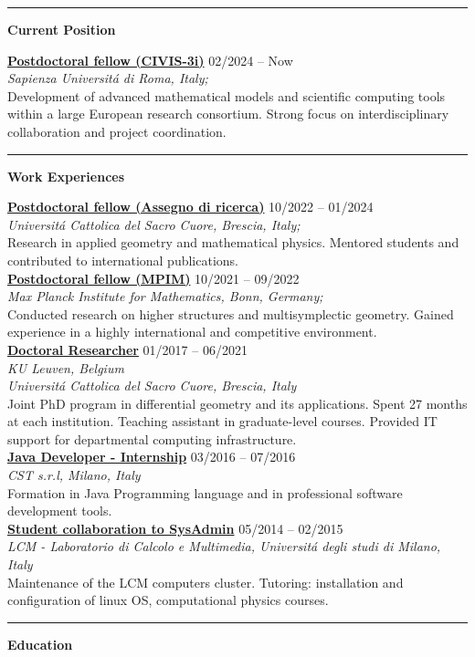 \documentclass[a4paper]{article}
\newcommand{\block}[1]{\hrule \vspace{0.2cm} \textbf{\Large #1} \vspace{0.2cm}}
\newcommand{\voice}[5]{\href{#4}{\textbf{#1}} \hfill #2 \\ \textit{#3} \\ {\small #5} \vspace{0.2cm} \\}
\begin{document}
\begin{minipage}[t]{0.6\columnwidth}

	\block{Current Position}

    	\voice{Postdoctoral fellow (CIVIS-3i)}
			{02/2024 -- Now}
			{Sapienza Universit\'a di Roma, Italy;}
			{https://civis3i.univ-amu.fr/en/civis3i-alliance-programme}       
			{Development of advanced mathematical models and scientific computing tools within a large European research consortium. Strong focus on interdisciplinary collaboration and project coordination.}

    \block{Work Experiences}

	\voice{Postdoctoral fellow (Assegno di ricerca)}
		{10/2022 -- 01/2024}
		{Universit\'a Cattolica del Sacro Cuore, Brescia, Italy;}
		{https://dipartimenti.unicatt.it/dmf-home}       
		{Research in applied geometry and mathematical physics. Mentored students and contributed to international publications.}
	\voice{Postdoctoral fellow (MPIM)}
		{10/2021 -- 09/2022}
		{Max Planck Institute for Mathematics, Bonn, Germany;}
		{https://www.mpim-bonn.mpg.de/}       
		 {Conducted research on higher structures and multisymplectic geometry. Gained experience in a highly international and competitive environment.}
        \voice{Doctoral Researcher}
    	{01/2017 -- 06/2021}
    	{KU Leuven, Belgium \\ Universit\'a Cattolica del Sacro Cuore, Brescia, Italy }
    	{https://scuoledidottorato.unicatt.it/phdschools/science-10574.html}
    	{Joint PhD program in differential geometry and its applications. Spent 27 months at each institution.
        Teaching assistant in graduate-level courses. Provided IT support for departmental computing infrastructure.}	
    \voice{Java Developer - Internship}
        {03/2016  -- 07/2016}
        {CST s.r.l, Milano, Italy}
        {https://www.csttech.it/}       
        {Formation in Java Programming language and in professional software development tools.}
    \voice{Student collaboration to SysAdmin}
        {05/2014 -- 02/2015}
        {LCM - Laboratorio di Calcolo e Multimedia, Universit\'a degli studi di Milano, Italy}
        {https://lcm.mi.infn.it/}       
        {Maintenance of the LCM computers cluster. Tutoring: installation and configuration of linux OS, computational physics courses.\vspace{-0.25cm}}
 

    \block{Education}


\end{minipage}
\end{document}
